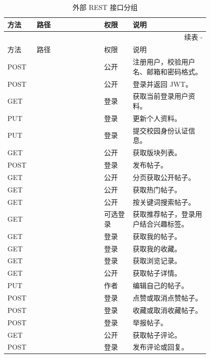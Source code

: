 \documentclass[UTF8,zihao=-4,a4paper]{ctexart}
\renewcommand{\thetable}{\thesection-\arabic{table}}
\begin{document}
\begin{longtable}{C{0.09\linewidth}L{0.28\linewidth}C{0.12\linewidth}L{0.32\linewidth}}
\caption{外部 REST 接口分组}\\
\toprule
方法 & 路径 & 权限 & 说明 \\
\midrule
\endfirsthead
\multicolumn{4}{r}{续表 \thetable}\\
\toprule
方法 & 路径 & 权限 & 说明 \\
\midrule
\endhead
\bottomrule
\endfoot
POST &  & 公开 & 注册用户，校验用户名、邮箱和密码格式。\\
POST &  & 公开 & 登录并返回 JWT。\\
GET &  & 登录 & 获取当前登录用户资料。\\
PUT &  & 登录 & 更新个人资料。\\
PUT &  & 登录 & 提交校园身份认证信息。\\
GET &  & 公开 & 获取版块列表。\\
POST &  & 登录 & 发布帖子。\\
GET &  & 公开 & 分页获取公开帖子。\\
GET &  & 公开 & 获取热门帖子。\\
GET &  & 公开 & 按关键词搜索帖子。\\
GET &  & 可选登录 & 获取推荐帖子，登录用户结合兴趣标签。\\
GET &  & 登录 & 获取我的帖子。\\
GET &  & 登录 & 获取我的收藏。\\
GET &  & 登录 & 获取浏览记录。\\
GET &  & 公开 & 获取帖子详情。\\
PUT &  & 作者 & 编辑自己的帖子。\\
POST &  & 登录 & 点赞或取消点赞帖子。\\
POST &  & 登录 & 收藏或取消收藏帖子。\\
POST &  & 登录 & 举报帖子。\\
GET &  & 公开 & 获取帖子评论。\\
POST &  & 登录 & 发布评论或回复。\\

\end{longtable}
\end{document}
